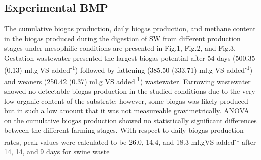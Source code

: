 \subsection{Experimental BMP}
The cumulative biogas production, daily biogas production, and methane content in the biogas produced during the digestion of SW from different production stages under mesophilic conditions are presented in Fig.1, Fig.2, and Fig.3. Gestation wastewater presented the largest biogas potential after 54 days (500.35 (0.13) ml.g VS added\textsuperscript{-1}) followed by fattening (385.50 (333.71) ml.g VS added\textsuperscript{-1}) and weaners (250.42 (0.37) ml.g VS added\textsuperscript{-1}) wastewater. Farrowing wastewater showed no detectable biogas production in the studied conditions due to the very low organic content of the substrate; however, some biogas was likely produced but in such a low amount that it was not measureable gravimetrically.  ANOVA on the cumulative biogas production showed no statistically significant differences between the different farming stages. With respect to daily biogas production rates, peak values were calculated to be 26.0, 14.4, and 18.3 ml.gVS added\textsuperscript{-1} after 14, 14, and 9 days for swine waste